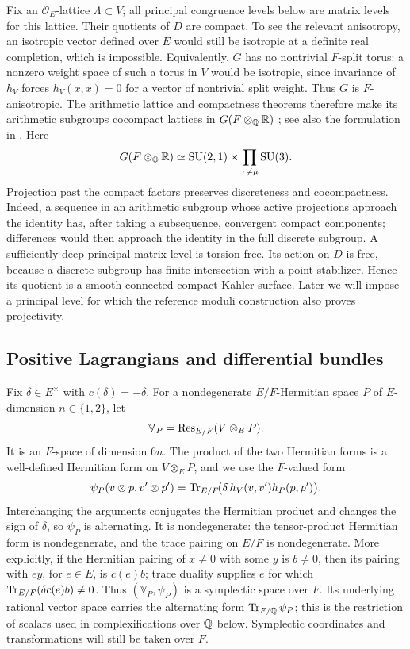 Fix an \(\mathcal O_E\)-lattice \(\Lambda\subset V\); all principal congruence
levels below are matrix levels for this lattice.  Their quotients of
\(D\) are compact.  To see the relevant anisotropy, an isotropic
vector defined over \(E\) would still be isotropic at a definite real
completion, which is impossible.  Equivalently, \(G\) has no
nontrivial \(F\)-split torus: a nonzero weight space of such a torus
in \(V\) would be isotropic, since invariance of \(h_V\) forces
\(h_V(x,x)=0\) for a vector of nontrivial split weight.  Thus \(G\)
is \(F\)-anisotropic.  The arithmetic lattice and compactness
theorems therefore make its arithmetic subgroups cocompact
lattices in \(G(F\otimes_{\mathbb{Q}}\mathbb{R})\)
\cite{BorelHarishChandra1962}; see also the formulation in
\cite[Theorem~3.3 and Proposition~3.5]{MilneShimura2017}.  Here
\[
 G(F\otimes_{\mathbb{Q}}\mathbb{R})\simeq \operatorname{SU}(2,1)\times\prod_{\tau\ne\mu}\operatorname{SU}(3).
\]
Projection past the compact factors preserves discreteness and
cocompactness.  Indeed, a sequence in an arithmetic subgroup whose
active projections approach the identity has, after taking a
subsequence, convergent compact components; differences would then
approach the identity in the full discrete subgroup.  A sufficiently
deep principal matrix level is torsion-free.  Its action on \(D\) is
free, because a discrete subgroup has finite intersection with a
point stabilizer.  Hence its quotient is a smooth connected compact
K\"ahler surface.  Later we will impose a principal level for which
the reference moduli construction also proves projectivity.

\subsection{Positive Lagrangians and differential bundles}\label{subsec:theta-lagrangians}

Fix \(\delta\in E^\times\) with \(c(\delta)=-\delta\).
For a nondegenerate \(E/F\)-Hermitian space \(P\) of \(E\)-dimension
\(n\in\{1,2\}\), let
\[
 \mathbb V_P=\operatorname{Res}_{E/F}(V\otimes_E P).
\]
It is an \(F\)-space of dimension \(6n\).  The product of the two
Hermitian forms is a well-defined Hermitian form on \(V\otimes_E P\),
and we use the \(F\)-valued form
\begin{equation}\label{eq:theta-symplectic-form}
 \psi_P(v\otimes p,v'\otimes p')
  =\operatorname{Tr}_{E/F}\!\bigl(\delta\,h_V(v,v')h_P(p,p')\bigr).
\end{equation}
Interchanging the arguments conjugates the Hermitian product and
changes the sign of \(\delta\), so \(\psi_P\) is alternating.  It
is nondegenerate: the tensor-product Hermitian form is nondegenerate,
and the trace pairing on \(E/F\) is nondegenerate.  More explicitly,
if the Hermitian pairing of \(x\ne0\) with some \(y\) is \(b\ne0\),
then its pairing with \(e y\), for \(e\in E\), is \(c(e)b\);
trace duality supplies \(e\) for which
\(\operatorname{Tr}_{E/F}(\delta c(e)b)\ne0\).  Thus \((\mathbb V_P,\psi_P)\) is
a symplectic space over \(F\).  Its underlying rational vector space
carries the alternating form \(\operatorname{Tr}_{F/\mathbb{Q}}\psi_P\); this is the
restriction of scalars used in complexifications over \(\mathbb{Q}\) below.
Symplectic coordinates and transformations will still be taken over
\(F\).

